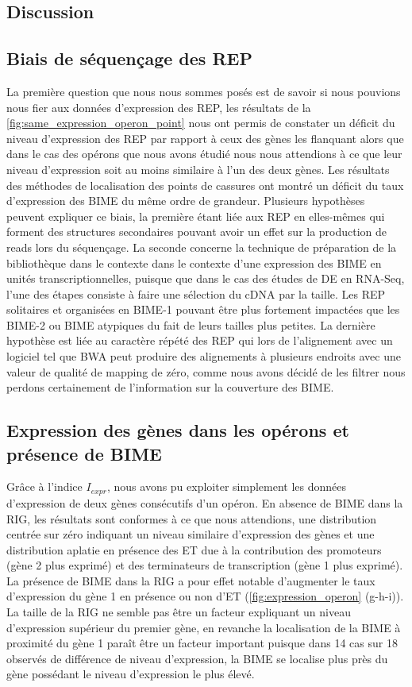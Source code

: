 \documentclass[12pt,a4paper]{report}
\begin{document}
\begin{onehalfspace}
\chapter*{Discussion}

\section*{Biais de séquençage des REP}
La première question que nous nous sommes posés est de savoir si nous pouvions nous fier aux données d'expression des REP, les résultats de la \autoref{fig:same_expression_operon_point} nous ont permis de constater un déficit du niveau d'expression des REP par rapport à ceux des gènes les flanquant alors que dans le cas des opérons que nous avons étudié nous nous attendions à ce que leur niveau d'expression soit au moins similaire à l'un des deux gènes. Les résultats des méthodes de localisation des points de cassures ont montré un déficit du taux d'expression des BIME du même ordre de grandeur. Plusieurs hypothèses peuvent expliquer ce biais, la première étant liée aux REP en elles-mêmes qui forment des structures secondaires pouvant avoir un effet sur la production de reads lors du séquençage. La seconde concerne la technique de préparation de la bibliothèque dans le contexte dans le contexte d'une expression des BIME en unités transcriptionnelles, puisque que dans le cas des études de DE en RNA-Seq, l'une des étapes consiste à faire une sélection du cDNA par la taille. Les REP solitaires et organisées en BIME-1 pouvant être plus fortement impactées que les BIME-2 ou BIME atypiques du fait de leurs tailles plus petites. La dernière hypothèse est liée au caractère répété des REP qui lors de l'alignement avec un logiciel tel que BWA peut produire des alignements à plusieurs endroits avec une valeur de qualité de mapping de zéro, comme nous avons décidé de les filtrer nous perdons certainement de l'information sur la couverture des BIME.

\section*{Expression des gènes dans les opérons et présence de BIME}
Grâce à l'indice $I_{expr}$, nous avons pu exploiter simplement les données d'expression de deux gènes consécutifs d'un opéron. En absence de BIME dans la RIG, les résultats sont conformes à ce que nous attendions, une distribution centrée sur zéro indiquant un niveau similaire d'expression des gènes et une distribution aplatie en présence des ET due à la contribution des promoteurs (gène 2 plus exprimé) et des terminateurs de transcription (gène 1 plus exprimé). La présence de BIME dans la RIG a pour effet notable d'augmenter le taux d'expression du gène 1 en présence ou non d'ET (\autoref{fig:expression_operon} (g-h-i)). La taille de la RIG ne semble pas être un facteur expliquant un niveau d'expression supérieur du premier gène, en revanche la localisation de la BIME à proximité du gène 1 paraît être un facteur important puisque dans 14 cas sur 18 observés de différence de niveau d'expression, la BIME se localise plus près du gène possédant le niveau d'expression le plus élevé.


\end{onehalfspace}
\end{document}
